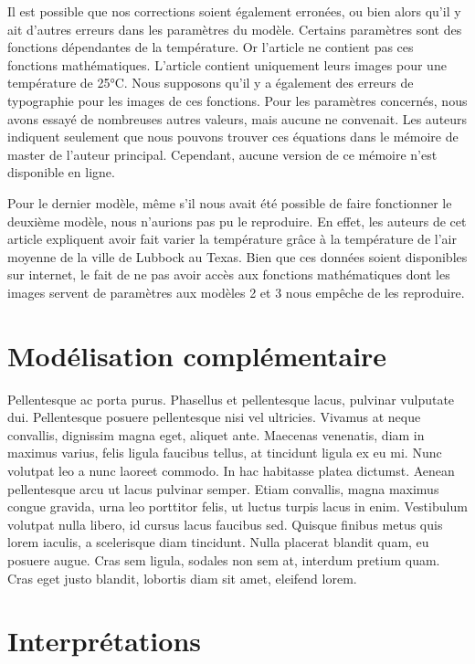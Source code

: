\documentclass[
  12pt,
  french,
  oneside]{article}
\begin{document}
Il est possible que nos corrections soient également erronées, ou bien
alors qu'il y ait d'autres erreurs dans les paramètres du modèle.
Certains paramètres sont des fonctions dépendantes de la température. Or
l'article ne contient pas ces fonctions mathématiques. L'article
contient uniquement leurs images pour une température de 25°C. Nous
supposons qu'il y a également des erreurs de typographie pour les images
de ces fonctions. Pour les paramètres concernés, nous avons essayé de
nombreuses autres valeurs, mais aucune ne convenait. Les auteurs
indiquent seulement que nous pouvons trouver ces équations dans le
mémoire de master de l'auteur principal. Cependant, aucune version de ce
mémoire n'est disponible en ligne.

Pour le dernier modèle, même s'il nous avait été possible de faire
fonctionner le deuxième modèle, nous n'aurions pas pu le reproduire. En
effet, les auteurs de cet article expliquent avoir fait varier la
température grâce à la température de l'air moyenne de la ville de
Lubbock au Texas. Bien que ces données soient disponibles sur internet,
le fait de ne pas avoir accès aux fonctions mathématiques dont les
images servent de paramètres aux modèles 2 et 3 nous empêche de les
reproduire.

\hypertarget{moduxe9lisation-compluxe9mentaire}{%
\section{Modélisation
complémentaire}\label{moduxe9lisation-compluxe9mentaire}}

Pellentesque ac porta purus. Phasellus et pellentesque lacus, pulvinar
vulputate dui. Pellentesque posuere pellentesque nisi vel ultricies.
Vivamus at neque convallis, dignissim magna eget, aliquet ante. Maecenas
venenatis, diam in maximus varius, felis ligula faucibus tellus, at
tincidunt ligula ex eu mi. Nunc volutpat leo a nunc laoreet commodo. In
hac habitasse platea dictumst. Aenean pellentesque arcu ut lacus
pulvinar semper. Etiam convallis, magna maximus congue gravida, urna leo
porttitor felis, ut luctus turpis lacus in enim. Vestibulum volutpat
nulla libero, id cursus lacus faucibus sed. Quisque finibus metus quis
lorem iaculis, a scelerisque diam tincidunt. Nulla placerat blandit
quam, eu posuere augue. Cras sem ligula, sodales non sem at, interdum
pretium quam. Cras eget justo blandit, lobortis diam sit amet, eleifend
lorem.

\hypertarget{interpruxe9tations}{%
\section{Interprétations}\label{interpruxe9tations}}
\end{document}
